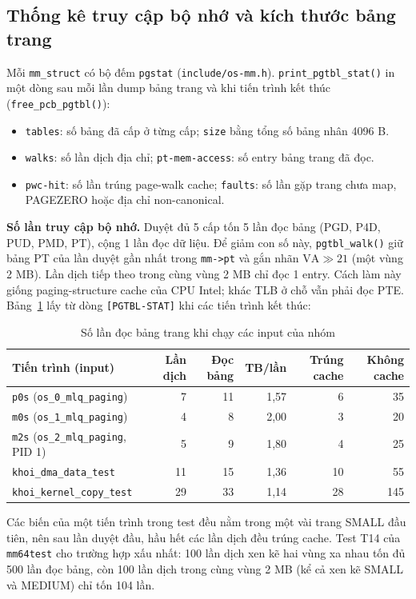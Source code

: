 \documentclass[12pt,a4paper]{article}
\begin{document}
	\subsection{Thống kê truy cập bộ nhớ và kích thước bảng trang}
	Mỗi \texttt{mm\_struct} có bộ đếm \texttt{pgstat} (\texttt{include/os-mm.h}). \texttt{print\_pgtbl\_stat()} in một dòng sau mỗi lần dump bảng trang và khi tiến trình kết thúc (\texttt{free\_pcb\_pgtbl()}):
	\begin{itemize}
	    \item \texttt{tables}: số bảng đã cấp ở từng cấp; \texttt{size} bằng tổng số bảng nhân 4096 B.
	    \item \texttt{walks}: số lần dịch địa chỉ; \texttt{pt-mem-access}: số entry bảng trang đã đọc.
	    \item \texttt{pwc-hit}: số lần trúng page-walk cache; \texttt{faults}: số lần gặp trang chưa map, PAGEZERO hoặc địa chỉ non-canonical.
	\end{itemize}

	\noindent\textbf{Số lần truy cập bộ nhớ.} Duyệt đủ 5 cấp tốn 5 lần đọc bảng (PGD, P4D, PUD, PMD, PT), cộng 1 lần đọc dữ liệu. Để giảm con số này, \texttt{pgtbl\_walk()} giữ bảng PT của lần duyệt gần nhất trong \texttt{mm->pt} và gắn nhãn \(\mathrm{VA} \gg 21\) (một vùng 2 MB). Lần dịch tiếp theo trong cùng vùng 2 MB chỉ đọc 1 entry. Cách làm này giống paging-structure cache của CPU Intel; khác TLB ở chỗ vẫn phải đọc PTE. Bảng~\ref{tab:nhan-access} lấy từ dòng \texttt{[PGTBL-STAT]} khi các tiến trình kết thúc:
	\begin{table}[htbp]
	\centering
	\footnotesize
	\setlength{\tabcolsep}{4pt}
	\begin{tabularx}{\linewidth}{@{}Xrrrrr@{}}
	\toprule
	\textbf{Tiến trình (input)} & \textbf{Lần dịch} & \textbf{Đọc bảng} & \textbf{TB/lần} & \textbf{Trúng cache} & \textbf{Không cache} \\
	\midrule
	\texttt{p0s} (\texttt{os\_0\_mlq\_paging}) & 7 & 11 & 1,57 & 6 & 35 \\
	\texttt{m0s} (\texttt{os\_1\_mlq\_paging}) & 4 & 8 & 2,00 & 3 & 20 \\
	\texttt{m2s} (\texttt{os\_2\_mlq\_paging}, PID 1) & 5 & 9 & 1,80 & 4 & 25 \\
	\texttt{khoi\_dma\_data\_test} & 11 & 15 & 1,36 & 10 & 55 \\
	\texttt{khoi\_kernel\_copy\_test} & 29 & 33 & 1,14 & 28 & 145 \\
	\bottomrule
	\end{tabularx}
	\caption{Số lần đọc bảng trang khi chạy các input của nhóm}
	\label{tab:nhan-access}
	\end{table}
	Các biến của một tiến trình trong test đều nằm trong một vài trang SMALL đầu tiên, nên sau lần duyệt đầu, hầu hết các lần dịch đều trúng cache. Test T14 của \texttt{mm64test} cho trường hợp xấu nhất: 100 lần dịch xen kẽ hai vùng xa nhau tốn đủ 500 lần đọc bảng, còn 100 lần dịch trong cùng vùng 2 MB (kể cả xen kẽ SMALL và MEDIUM) chỉ tốn 104 lần.
\end{document}
